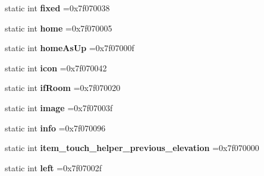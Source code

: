 \begin{DoxyCompactItemize}
\item 
\mbox{\label{classandroid_1_1support_1_1design_1_1R_1_1id_adbeac4112c2f65578d33b8a2c7e246e3}} 
static int {\bfseries fixed} =0x7f070038
\item 
\mbox{\label{classandroid_1_1support_1_1design_1_1R_1_1id_a4dc28a199ebcd1e81a98ab52775461e9}} 
static int {\bfseries home} =0x7f070005
\item 
\mbox{\label{classandroid_1_1support_1_1design_1_1R_1_1id_acbd02efa0a544705af022149a74af6c9}} 
static int {\bfseries home\+As\+Up} =0x7f07000f
\item 
\mbox{\label{classandroid_1_1support_1_1design_1_1R_1_1id_a51fafb8570076696910b899d1d1574de}} 
static int {\bfseries icon} =0x7f070042
\item 
\mbox{\label{classandroid_1_1support_1_1design_1_1R_1_1id_a6099bbe70e003286f483c4ea1644d272}} 
static int {\bfseries if\+Room} =0x7f070020
\item 
\mbox{\label{classandroid_1_1support_1_1design_1_1R_1_1id_a13e7209f8b68cb06ee689c4b67ddc8cc}} 
static int {\bfseries image} =0x7f07003f
\item 
\mbox{\label{classandroid_1_1support_1_1design_1_1R_1_1id_a0ebcc6ea1da98c9400ee0d36466f3aeb}} 
static int {\bfseries info} =0x7f070096
\item 
\mbox{\label{classandroid_1_1support_1_1design_1_1R_1_1id_a12110a2dfed60770fcf89bb8714aabb7}} 
static int {\bfseries item\+\_\+touch\+\_\+helper\+\_\+previous\+\_\+elevation} =0x7f070000
\item 
\mbox{\label{classandroid_1_1support_1_1design_1_1R_1_1id_ab240b1fa301b9945c91da34ff6d30eed}} 
static int {\bfseries left} =0x7f07002f
\item 
\mbox{\label{classandroid_1_1support_1_1design_1_1R_1_1id_abe76163d854953bfb918c749a03f39fc}} 

\end{DoxyCompactItemize}
